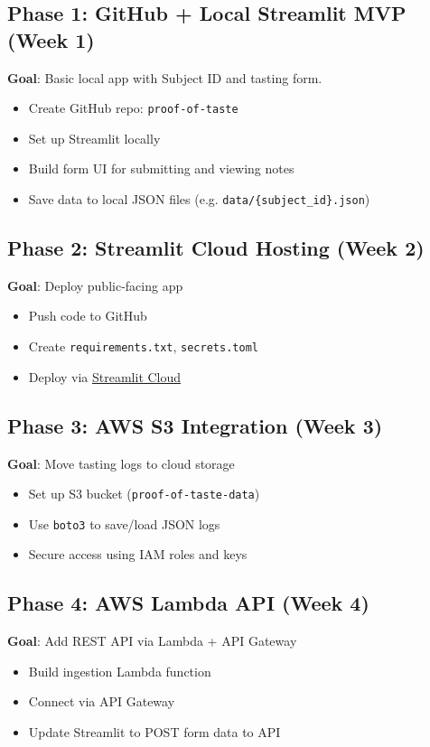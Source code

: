 \documentclass[12pt]{article}
\begin{document}
\subsection*{Phase 1: GitHub + Local Streamlit MVP (Week 1)}
\textbf{Goal}: Basic local app with Subject ID and tasting form.
\begin{itemize}
\item Create GitHub repo: \texttt{proof-of-taste}
\item Set up Streamlit locally
\item Build form UI for submitting and viewing notes
\item Save data to local JSON files (e.g. \verb|data/{subject_id}.json|)
\end{itemize}

\subsection*{Phase 2: Streamlit Cloud Hosting (Week 2)}
\textbf{Goal}: Deploy public-facing app
\begin{itemize}
\item Push code to GitHub
\item Create \texttt{requirements.txt}, \texttt{secrets.toml}
\item Deploy via \href{https://streamlit.io/cloud}{Streamlit Cloud}
\end{itemize}

\subsection*{Phase 3: AWS S3 Integration (Week 3)}
\textbf{Goal}: Move tasting logs to cloud storage
\begin{itemize}
\item Set up S3 bucket (\texttt{proof-of-taste-data})
\item Use \texttt{boto3} to save/load JSON logs
\item Secure access using IAM roles and keys
\end{itemize}

\subsection*{Phase 4: AWS Lambda API (Week 4)}
\textbf{Goal}: Add REST API via Lambda + API Gateway
\begin{itemize}
\item Build ingestion Lambda function
\item Connect via API Gateway
\item Update Streamlit to POST form data to API
\end{itemize}
\end{document}
